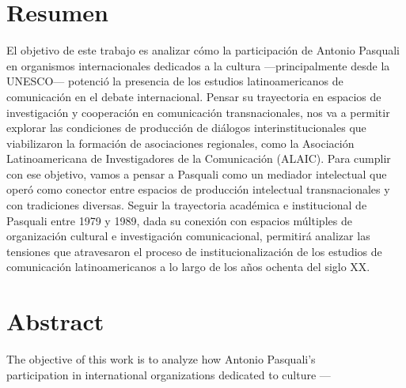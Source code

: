 \documentclass{tufte-handout}
\begin{document}
\begin{titlepage}
\vspace*{2.5em}


\hypertarget{resumen}{%
\section{Resumen}\label{resumen}}

El objetivo de este trabajo es analizar cómo la participación de Antonio
Pasquali en organismos internacionales dedicados a la cultura
---principalmente desde la UNESCO--- potenció la presencia de los
estudios latinoamericanos de comunicación en el debate internacional.
Pensar su trayectoria en espacios de investigación y cooperación en
comunicación transnacionales, nos va a permitir explorar las condiciones
de producción de diálogos interinstitucionales que viabilizaron la
formación de asociaciones regionales, como la Asociación Latinoamericana
de Investigadores de la Comunicación (ALAIC). Para cumplir con ese
objetivo, vamos a pensar a Pasquali como un mediador intelectual que
operó como conector entre espacios de producción intelectual
transnacionales y con tradiciones diversas. Seguir la trayectoria
académica e institucional de Pasquali entre 1979 y 1989, dada su
conexión con espacios múltiples de organización cultural e investigación
comunicacional, permitirá analizar las tensiones que atravesaron el
proceso de institucionalización de los estudios de comunicación
latinoamericanos a lo largo de los años ochenta del siglo XX.

\hypertarget{abstract}{%
\section{Abstract}\label{abstract}}

The objective of this work is to analyze how Antonio Pasquali's\\\noindent
participation in international organizations dedicated to culture ---


\enlargethispage{2\baselineskip}

\vspace*{2em}



 \end{titlepage}

\end{document}
